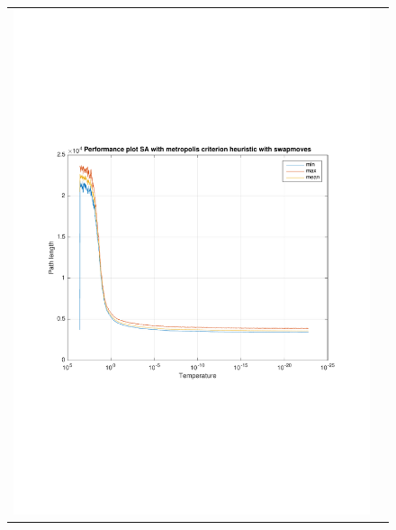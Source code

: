 \documentclass[a4paper, 11pt]{scrartcl}
\begin{document}
\begin{figure}[!ht]
  \centering
  \begin{tabular}{cc}
    \includegraphics[scale=0.4, trim={3cm 6cm 1cm 6cm}]{../figures/perfPlot_SA_metropolis_swap.pdf} & 

\end{tabular}
\end{figure}
\end{document}
